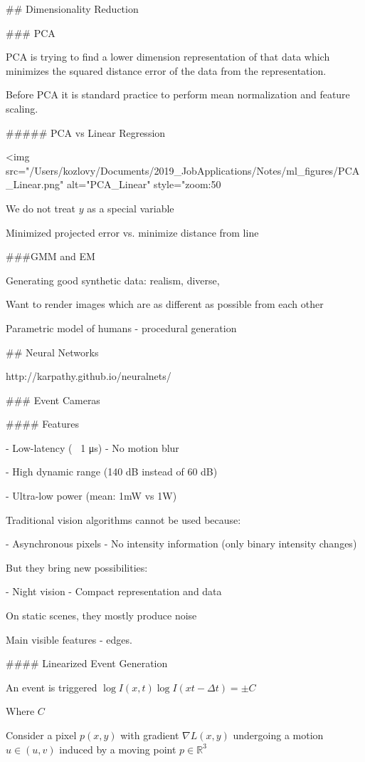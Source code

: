 ## Dimensionality Reduction

### PCA

PCA is trying to find a lower dimension representation of that data which minimizes the squared distance error of the data from the representation.

Before PCA it is standard practice to perform mean normalization and feature scaling. 

##### PCA vs Linear Regression

<img src="/Users/kozlovy/Documents/2019_JobApplications/Notes/ml_figures/PCA_Linear.png" alt="PCA_Linear" style="zoom:50%

We do not treat $y$ as a special variable

Minimized projected error vs. minimize distance from line

###GMM and EM

Generating good synthetic data: 
realism, 
diverse,


Want to render images which are as different as possible from each other


Parametric model of humans - procedural generation



## Neural Networks

http://karpathy.github.io/neuralnets/

### Event Cameras

#### Features

- Low-latency (~ 1 μs)
- No motion blur

- High dynamic range (140 dB instead of 60 dB)

- Ultra-low power (mean: 1mW vs 1W)

Traditional vision algorithms cannot be used because:

- Asynchronous pixels
- No intensity information (only binary intensity changes)

But they bring new possibilities:

- Night vision
- Compact representation and data

On static scenes, they mostly produce noise

Main visible features - edges. 

#### Linearized Event Generation

An event is triggered $\log I(x,t) \log I(xt-\Delta t)=\pm C$

Where $C$ 



Consider a pixel $p(x,y)$ with gradient $\nabla L(x,y)$ undergoing a motion $u\in(u,v)$ induced by a moving point $p \in\mathbb{R}^3 $



